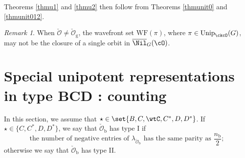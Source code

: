 \documentclass[12pt]{amsart}
\newcommand{\WF}{\mathrm{WF}}
\newcommand{\CO}{{\mathcal {O}}}
\newcommand{\be}{\begin {equation}}
\newcommand{\ee}{\end {equation}}
\numberwithin{equation}{section}
\theoremstyle{remark}
\newtheorem{remark}[thm]{Remark}
\def\Unip{\mathrm{Unip}}
\begin{document}
Theorems \ref{thmu1} and \ref{thmu2} then follow from Theorems \ref{thmunit0} and \ref{thmunit012}.

\begin{remark}
  When $\check \CO\neq \check \CO_{\mathrm g}$, the wavefront set $\WF(\pi)$, where $\pi\in \Unip_{\ckcO}(G)$,  may not be the closure of a single orbit in
   $\overline \Nil_{G}(\cO)$.
\end{remark}



\section{Special unipotent representations in type BCD : counting}\label{sec:BCD}





In this section, we assume that $\star \in \set{B,C,\wtC,C^{*},D,D^{*}}$.
If  $\star\in \{C, C^*, D, D^*\}$, we say that $\check \CO_\mathrm b$ has type I if
  \be\label{assumi}
  \textrm{the number of negative entries of $\lambda_{\check \CO_\mathrm b}$ has the same parity as $\frac{n_\mathrm b}{2}$};
  \ee
  otherwise we say that $\check \CO_\mathrm b$ has type II.
\end{document}

